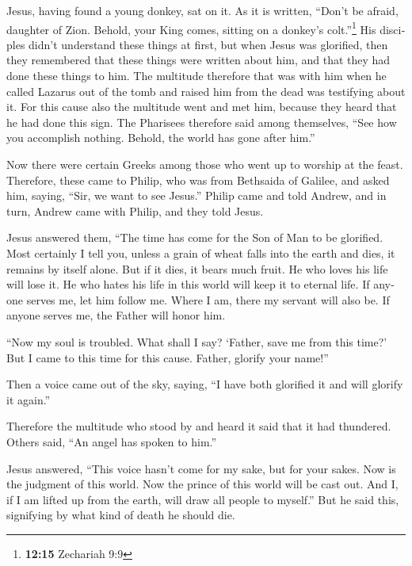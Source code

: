 \begin{paracol}{2}
\begin{otherlanguage}{english}
 Jesus, having found a young donkey, sat on it. As it is
written,  ``Don't be afraid, daughter of Zion. Behold,
your King comes, sitting on a donkey's colt.''\footnote{\textbf{12:15}
  Zechariah 9:9}  His disciples didn't understand these
things at first, but when Jesus was glorified, then they remembered that
these things were written about him, and that they had done these things
to him.  The multitude therefore that was with him when
he called Lazarus out of the tomb and raised him from the dead was
testifying about it.  For this cause also the multitude
went and met him, because they heard that he had done this sign.
 The Pharisees therefore said among themselves, ``See how
you accomplish nothing. Behold, the world has gone after him.''

 Now there were certain Greeks among those who went up to
worship at the feast.  Therefore, these came to Philip,
who was from Bethsaida of Galilee, and asked him, saying, ``Sir, we want
to see Jesus.''  Philip came and told Andrew, and in
turn, Andrew came with Philip, and they told Jesus.

 Jesus answered them, ``The time has come for the Son of
Man to be glorified.  Most certainly I tell you, unless a
grain of wheat falls into the earth and dies, it remains by itself
alone. But if it dies, it bears much fruit.  He who loves
his life will lose it. He who hates his life in this world will keep it
to eternal life.  If anyone serves me, let him follow me.
Where I am, there my servant will also be. If anyone serves me, the
Father will honor him.

 ``Now my soul is troubled. What shall I say? `Father,
save me from this time?' But I came to this time for this cause.
 Father, glorify your name!''

Then a voice came out of the sky, saying, ``I have both glorified it and
will glorify it again.''

 Therefore the multitude who stood by and heard it said
that it had thundered. Others said, ``An angel has spoken to him.''

 Jesus answered, ``This voice hasn't come for my sake,
but for your sakes.  Now is the judgment of this world.
Now the prince of this world will be cast out.  And I, if
I am lifted up from the earth, will draw all people to myself.''
 But he said this, signifying by what kind of death he
should die.


\end{otherlanguage}
\end{paracol}
